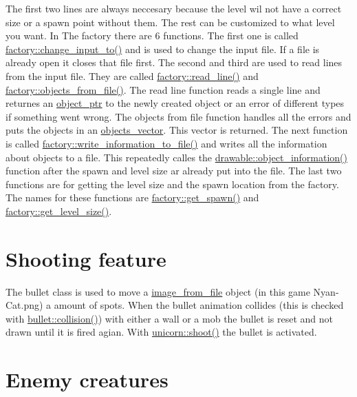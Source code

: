 The first two lines are always neccesary because the level wil not have a correct size or a spawn point without them. The rest can be customized to what level you want. In The factory there are 6 functions. The first one is called \hyperlink{classfactory_a9e164a8fbb65188de99c39d55d7cc384}{factory\+::change\+\_\+input\+\_\+to()} and is used to change the input file. If a file is already open it closes that file first. The second and third are used to read lines from the input file. They are called \hyperlink{classfactory_a82385866bc910c1b3a3e82d56487dd24}{factory\+::read\+\_\+line()} and \hyperlink{classfactory_afb2fad4ac9b0f39b1bfc3f3fc8d218b6}{factory\+::objects\+\_\+from\+\_\+file()}. The read line function reads a single line and returnes an \hyperlink{drawable_8hpp_aab5add95f06d2ba25dbfed8eb07274fa}{object\+\_\+ptr} to the newly created object or an error of different types if something went wrong. The objects from file function handles all the errors and puts the objects in an \hyperlink{drawable_8hpp_a6c0fdb1dfd0c34dbbdbb5dcd3c608b07}{objects\+\_\+vector}. This vector is returned. The next function is called \hyperlink{classfactory_af17f2a44d75cf8ccf712384341c2fcde}{factory\+::write\+\_\+information\+\_\+to\+\_\+file()} and writes all the information about objects to a file. This repeatedly calles the \hyperlink{classdrawable_a2ed0f8bb53f33477f7722efa7bb24583}{drawable\+::object\+\_\+information()} function after the spawn and level size ar already put into the file. The last two functions are for getting the level size and the spawn location from the factory. The names for these functions are \hyperlink{classfactory_a3c3a039b8f76a947267dbe659166550b}{factory\+::get\+\_\+spawn()} and \hyperlink{classfactory_af9bb026273b34fc032ca5ac73d457611}{factory\+::get\+\_\+level\+\_\+size()}.\hypertarget{index_bullet}{}\section{Shooting feature}\label{index_bullet}
The bullet class is used to move a \hyperlink{classimage__from__file}{image\+\_\+from\+\_\+file} object (in this game Nyan-\/\+Cat.\+png) a amount of spots. When the bullet animation collides (this is checked with \hyperlink{classbullet_ab7e5c677bbd642df24a2251bb58249b7}{bullet\+::collision()}) with either a wall or a mob the bullet is reset and not drawn until it is fired agian. With \hyperlink{classunicorn_af448a3fa5fc5f09254b50afa151ce42b}{unicorn\+::shoot()} the bullet is activated.\hypertarget{index_mob}{}\section{Enemy creatures}\label{index_mob}
